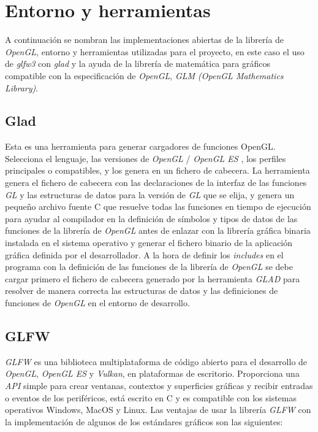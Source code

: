 \documentclass[a4paper]{book}
\begin{document}
\section{Entorno y herramientas}
\label{sec:Entorno}

A continuación se nombran las implementaciones abiertas de la librería de \textit{OpenGL}, entorno y herramientas
utilizadas para el proyecto, en este caso el uso de \textit{glfw3} con \textit{glad} y la ayuda de la librería de matemática
para gráficos compatible con la especificación de \textit{OpenGL}, \textit{GLM (OpenGL Mathematics Library)}.

\subsection{Glad}
\label{subsec:Glad}

Esta es una herramienta para generar cargadores de funciones OpenGL. Selecciona el lenguaje, las versiones
de \textit{OpenGL} / \textit{OpenGL ES} , los perfiles principales o compatibles, y los genera en un fichero de cabecera. La herramienta
genera el fichero de cabecera con las declaraciones de la interfaz de las funciones \textit{GL} y
las estructuras de datos para la versión de \textit{GL} que se elija, y genera un pequeño archivo fuente C que
resuelve todas las funciones en tiempo de ejecución para ayudar al compilador en la definición de
símbolos y tipos de datos de las funciones de la librería de \textit{OpenGL} antes de enlazar con la librería
gráfica binaria instalada en el sistema operativo y generar el fichero binario de la aplicación gráfica
definida por el desarrollador. A la hora de definir los \textit{includes} en el programa con la definición de las funciones de la librería de
\textit{OpenGL} se debe cargar primero el fichero de cabecera generado por la herramienta \textit{GLAD} para resolver de
manera correcta las estructuras de datos y las definiciones de funciones de \textit{OpenGL} en el entorno de
desarrollo. \cite{opengl:_glad}

\subsection{GLFW}
\label{subsec:GLFW}

\textit{GLFW} es una biblioteca multiplataforma de código abierto para el desarrollo de \textit{OpenGL}, \textit{OpenGL ES} y \textit{Vulkan},
en plataformas de escritorio. Proporciona una \textit{API} simple para crear ventanas, contextos y superficies
gráficas y recibir entradas o eventos de los periféricos, está escrito en C y es compatible con los sistemas
operativos Windows, MacOS y Linux. Las ventajas de usar la librería \textit{GLFW} con la implementación de algunos de los
estándares gráficos son las siguientes:
\end{document}
